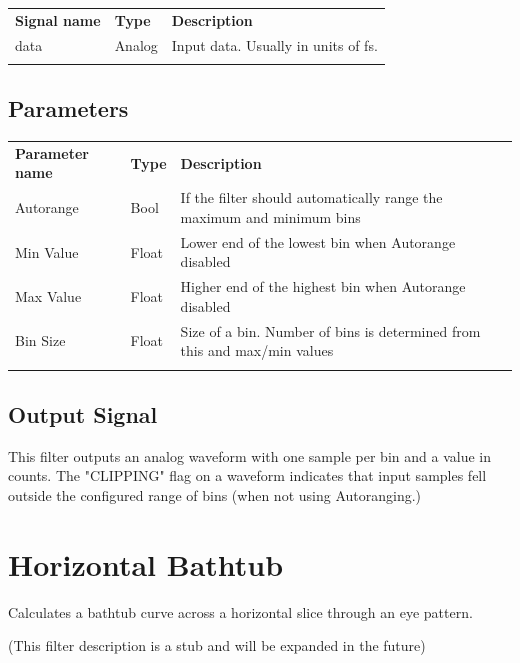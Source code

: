\begin{tabularx}{16cm}{llX}
\thickhline
\textbf{Signal name} & \textbf{Type} & \textbf{Description} \\
\thickhline
data & Analog & Input data. Usually in units of fs.\\
\thickhline
\end{tabularx}

\subsection{Parameters}

\begin{tabularx}{16cm}{llX}
\thickhline
\textbf{Parameter name} & \textbf{Type} & \textbf{Description} \\
\thickhline
Autorange & Bool & If the filter should automatically range the maximum and minimum bins\\
\thinhline
Min Value & Float & Lower end of the lowest bin when Autorange disabled\\
\thinhline
Max Value & Float & Higher end of the highest bin when Autorange disabled\\
\thinhline
Bin Size & Float & Size of a bin. Number of bins is determined from this and max/min values\\
\thickhline
\end{tabularx}

\subsection{Output Signal}

This filter outputs an analog waveform with one sample per bin and a value in counts. The "CLIPPING" flag on a waveform
indicates that input samples fell outside the configured range of bins (when not using Autoranging.)

\pagebreak
\section{Horizontal Bathtub}

Calculates a bathtub curve across a horizontal slice through an eye pattern.

(This filter description is a stub and will be expanded in the future)

\pagebreak

